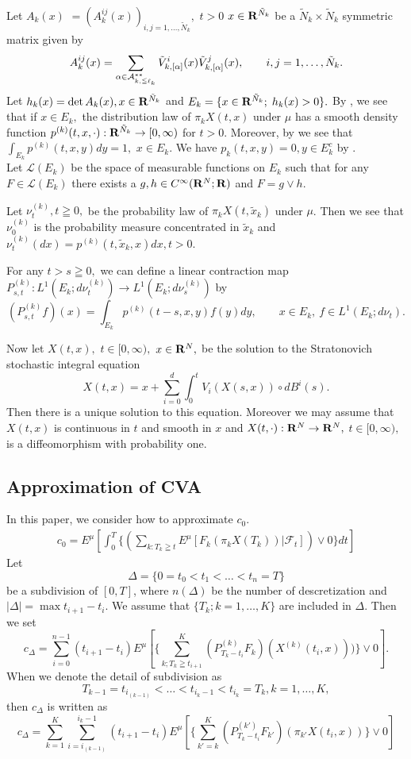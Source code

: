 \documentclass[12pt]{article}
\begin{document}
Let $A_k(x)$ $= (A_k^{ij}(x))_{i,j=1,\ldots ,\tilde{N}_k},$ $t>0$ $x\in {\bf R}^{\tilde{N}_k}$ 
be a $\tilde{N}_k \times \tilde{N}_k$ symmetric matrix given by
$$
A_k^{ij}(x) 
= \sum_{\alpha \in {\cal A}^{**}_{k, \leqq \ell_k}}
\tilde{V}^i_{k,[\alpha ]}(x)\tilde{V}^j_{k,[\alpha ] }(x),
\qquad i,j=1,\ldots , \tilde{N}_k.
$$
Let $h_k(x) = \det A_k(x), x\in {\bf R}^{ \tilde{N}_k}$ 
and $E_k= \{ x\in {\bf R}^{\tilde{N}_k};\; h_k(x)>0\} .$
By \cite{KS2}, we see that if $x\in E_k,$ 
the distribution law of $\pi_k{X}(t,x)$ under $\mu$ has a smooth density function
$p^{(k)}(t,x,\cdot ):{\bf R}^{\tilde{N}_k}\to [0,\infty )$ for $t>0.$
Moreover, by \cite{KM} we see  that $\int_{E_k} p^{(k)}(t,x,y)dy =1,$ $x\in E_k.$ 
We have $p_k(t,x,y)=0, y\in E_k^c$ by \cite{KM}.\\
Let $\mathcal{L}(E_k)$ be the space of measurable functions on $E_k$ such that
for any $F\in \mathcal{L}(E_k)$ there exists a $g, h \in C^{\infty}({\bf R}^{N};{\bf R})$ and
$F=g\vee h$.

Let $\nu^{(k)}_t, t\geqq 0,$ be the probability law of $\pi_k{X}(t, \tilde{x}_k)$ under $\mu$.
Then we see that $\nu^{(k)}_0$ is the probability measure concentrated in $\tilde{x}_k$ and $\nu^{(k)}_t(dx)
=p^{(k)}(t,\tilde{x}_k, x)dx, t>0.$

For any $t>s\geqq 0,$ 
we can define a linear contraction map 
$P^{(k)}_{s,t}:L^1(E_k;d\nu^{(k)}_t)\to L^1(E_k;d\nu^{(k)}_s)$ by
$$
(P^{(k)}_{s,t}f)(x) = \int_{E_k} p^{(k)}(t-s,x,y)f(y) dy,
\qquad x \in E_k,\ f\in L^1(E_k;d\nu_t).
$$

Now let $X(t,x),$ $t\in [0,\infty ),$ $x\in {\bf R}^N,$ 
be the solution to the Stratonovich stochastic integral equation 
\begin{equation}
X(t,x) = x + \sum_{i=0}^{d} \int_{0}^{t} V_i(X(s,x))\circ dB^i(s).
\label{eq:SDE}
\end{equation}
Then there is a unique solution 
to this equation. 
Moreover we may assume that  $X(t,x)$ 
is continuous in $t$ and smooth in $x$ 
and $X(t,\cdot ):{\bf R}^N\to {\bf R}^N,$ $t \in [0,\infty ),$
is a diffeomorphism with probability one.

\subsection{Approximation of CVA}
In this paper, we consider how to approximate $c_0$.
\begin{align}
c_0 = E^{\mu}[\int_{0}^T \{( \sum_{k:T_k\geqq t} E^{\mu}[F_k(\pi_k{X}(T_k)) |\mathcal{F}_t])\vee0\}dt ]
\end{align}
Let 
$$\Delta = \{0=t_0 < t_1 < \ldots < t_n= T \}$$ be a subdivision of $[0,T]$, where $n(\Delta)$  be the number of descretization and $|\Delta| = \max{t_{i+1}-t_i}$. We assume that $\{T_k; k=1,\ldots,K\}$ are included in $\Delta$. Then we set
$$c_{\Delta}=\sum_{i=0}^{n-1}(t_{i+1}-t_i)E^{\mu}[\{\sum_{k; T_k \geqq t_{i+1}}^K(P_{T_k-t_i}^{(k)}F_k)(X^{(k)}(t_i,x))) \}\vee 0].
$$
When we denote the detail of subdivision as 
$$T_{k-1} = t_{i_{(k-1)}} < \ldots < t_{i_k-1} < t_{i_k}=T_k, k=1,\ldots,K,$$
then $c_{\Delta}$ is written as
$$
c_{\Delta}=\sum_{k=1}^K\sum_{i=i_{(k-1)}}^{{i_{k}}-1}(t_{i+1}-t_i) E^{\mu}[ \{\sum_{k'=k}^K(P_{T_k-t_i}^{(k')}F_{k'})(\pi_{k'} X(t_i,x))\}\vee0 ]
 $$
\end{document}
